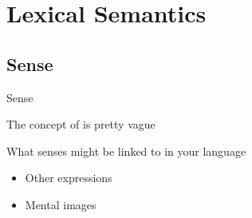 \documentclass{beamer}
\newcommand{\subonetwo}{What do we mean by meaning?}
\newcommand{\subtwoone}{Sense}
\begin{document}


  \section{Lexical Semantics}
    \subsection{\subtwoone}
      \begin{frame}{\subtwoone}
        \begin{block}{}
          The concept of  is pretty vague
        \end{block}
        \begin{block}{What senses might be linked to in your language}
          \begin{itemize}
            \item Other expressions
            \item Mental images
          \end{itemize}
        \end{block}
      \end{frame}
\end{document}
